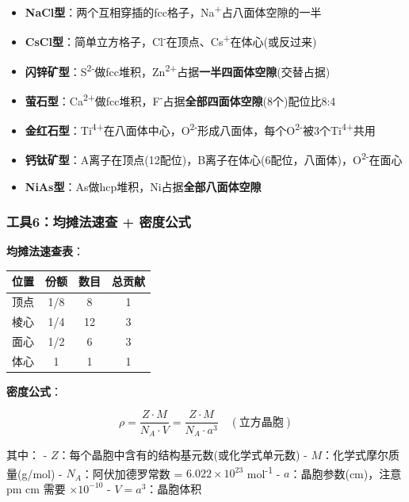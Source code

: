 \begin{itemize}
\tightlist
\item
  \textbf{NaCl型}：两个互相穿插的fcc格子，Na\textsuperscript{+}占八面体空隙的一半
\item
  \textbf{CsCl型}：简单立方格子，Cl\textsuperscript{-}在顶点、Cs\textsuperscript{+}在体心(或反过来)
\item
  \textbf{闪锌矿型}：S\textsuperscript{2-}做fcc堆积，Zn\textsuperscript{2+}占据\textbf{一半四面体空隙}(交替占据)
\item
  \textbf{萤石型}：Ca\textsuperscript{2+}做fcc堆积，F\textsuperscript{-}占据\textbf{全部四面体空隙}(8个)\箭 配位比8:4
\item
  \textbf{金红石型}：Ti\textsuperscript{4+}在八面体中心，O\textsuperscript{2-}形成八面体，每个O\textsuperscript{2-}被3个Ti\textsuperscript{4+}共用
\item
  \textbf{钙钛矿型}：A离子在顶点(12配位)，B离子在体心(6配位，八面体)，O\textsuperscript{2-}在面心
\item
  \textbf{NiAs型}：As做hcp堆积，Ni占据\textbf{全部八面体空隙}
\end{itemize}

\subsubsection{工具6：均摊法速查 + 密度公式}\label{ux5de5ux51776ux5747ux644aux6cd5ux901fux67e5-ux5bc6ux5ea6ux516cux5f0f}

\textbf{均摊法速查表}：

{\def\LTcaptype{none} %
\begin{longtable}[]{@{}lccc@{}}
\toprule\noalign{}
位置 & 份额 & 数目 & 总贡献 \\
\midrule\noalign{}
\endhead
\bottomrule\noalign{}
\endlastfoot
顶点 & 1/8 & 8 & 1 \\
棱心 & 1/4 & 12 & 3 \\
面心 & 1/2 & 6 & 3 \\
体心 & 1 & 1 & 1 \\
\end{longtable}
}

\textbf{密度公式}：

\[\rho = \frac{Z \cdot M}{N_A \cdot V} = \frac{Z \cdot M}{N_A \cdot a^3} \quad (\text{立方晶胞})\]

其中：
- \(Z\)：每个晶胞中含有的结构基元数(或化学式单元数)
- \(M\)：化学式摩尔质量(g/mol)
- \(N_A\)：阿伏加德罗常数 = \(6.022 \times 10^{23}\) mol\textsuperscript{-1}
- \(a\)：晶胞参数(cm)，注意pm \箭 cm 需要 \(\times 10^{-10}\)
- \(V = a^3\)：晶胞体积

